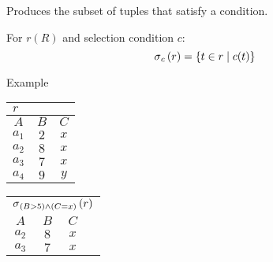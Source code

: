 \begin{multicols}{2}
    
    \begin{CheatsheetEntryFrame}


        Produces the subset of tuples that satisfy a condition.
        
        For $r(R)$ and selection condition $c$:
        \begin{equation*}
            \operatorname{\sigma}_{c}{(r)} = \left\{{t \in r} \mid {c(t)}\right\}
        \end{equation*}

        \SubsectionFrameRemoveSeparation
        \begin{RelAlgSubsection}{Example}
        \begin{center}
            {\footnotesize%
                \begin{tabular}{|ccc|}
                    \multicolumn{3}{l}{\normalsize $r$}
                        \\ \hline
                    \multicolumn{1}{|c}{$A$}
                        & \multicolumn{1}{c}{$B$}
                        & \multicolumn{1}{c|}{$C$}
                        \\ \hline\hline
                    $a_1$ & $2$ & $x$ \\
                    $a_2$ & $8$ & $x$ \\
                    $a_3$ & $7$ & $x$ \\
                    $a_4$ & $9$ & $y$ \\ \hline
                \end{tabular}
                \qquad \qquad
                \begin{tabular}{|ccc|c}
                    \multicolumn{4}{l}{\normalsize $\operatorname{\sigma}_{(B>5) \wedge (C=x)}{(r)}$}
                        \\ \cline{1-3}
                    \multicolumn{1}{|c}{$A$}
                        & \multicolumn{1}{c}{$B$}
                        & \multicolumn{1}{c|}{$C$}
                        & \multicolumn{1}{c}{} %
                        \\ \cline{1-3} \cline{1-3}
                    $a_2$ & $8$ & $x$ & \multicolumn{1}{c}{} \\
                    $a_3$ & $7$ & $x$ & \multicolumn{1}{c}{} \\ \cline{1-3}
                \end{tabular}
            }
        \end{center}
        \end{RelAlgSubsection}


\end{CheatsheetEntryFrame}
\end{multicols}
